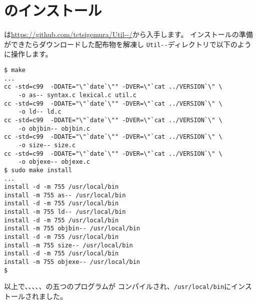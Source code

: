 % 
%
\chapter{\util のインストール}

\util は\url{https://github.com/tctsigemura/Util--/}から入手します。
インストールの準備ができたらダウンロードした配布物を解凍し
\verb/Util--/ディレクトリで以下のように操作します。

\begin{mylist}
\begin{verbatim}
$ make
...
cc -std=c99  -DDATE="\"`date`\"" -DVER=\"`cat ../VERSION`\" \
    -o as-- syntax.c lexical.c util.c
cc -std=c99  -DDATE="\"`date`\"" -DVER=\"`cat ../VERSION`\" \
    -o ld-- ld.c
cc -std=c99  -DDATE="\"`date`\"" -DVER=\"`cat ../VERSION`\" \
    -o objbin-- objbin.c
cc -std=c99  -DDATE="\"`date`\"" -DVER=\"`cat ../VERSION`\" \
    -o size-- size.c
cc -std=c99  -DDATE="\"`date`\"" -DVER=\"`cat ../VERSION`\" \
    -o objexe-- objexe.c
$ sudo make install
...
install -d -m 755 /usr/local/bin
install -m 755 as-- /usr/local/bin
install -d -m 755 /usr/local/bin
install -m 755 ld-- /usr/local/bin
install -d -m 755 /usr/local/bin
install -m 755 objbin-- /usr/local/bin
install -d -m 755 /usr/local/bin
install -m 755 size-- /usr/local/bin
install -d -m 755 /usr/local/bin
install -m 755 objexe-- /usr/local/bin
$
\end{verbatim}
\end{mylist}

以上で、\as 、\ld 、\objbin 、\objexe 、\size の五つのプログラムが
コンパイルされ、\verb;/usr/local/bin;にインストールされました。
